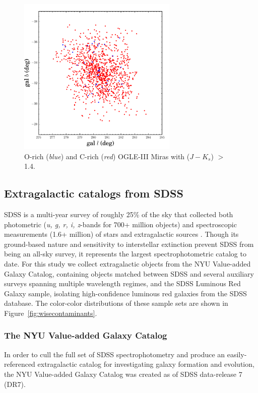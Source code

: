 \begin{figure}[h]
\includegraphics[width=3in]{figs/ogle_2mass_wise_miras.pdf}
\caption{O-rich (\emph{blue}) and C-rich (\emph{red}) OGLE-III Miras with ($J-K_s$) $>$ 1.4. \label{fig:oglegalplot}}
\end{figure}

\subsection{Extragalactic catalogs from SDSS}
SDSS is a multi-year survey of roughly 25\% of the sky that collected both photometric (\emph{u, g, r, i, z}-bands for 700+ million objects) and spectroscopic measurements (1.6+ million) of stars and extragalactic sources \citep{2000AJ....120.1579Y}. Though its ground-based nature and sensitivity to interstellar extinction prevent SDSS from being an all-sky survey, it represents the largest spectrophotometric catalog to date. For this study we collect extragalactic objects from the NYU Value-added Galaxy Catalog, containing objects matched between SDSS and several auxiliary surveys spanning multiple wavelength regimes, and the SDSS Luminous Red Galaxy sample, isolating high-confidence luminous red galaxies from the SDSS database. The color-color distributions of these sample sets are shown in Figure~\ref{fig:wisecontaminants}.

\subsubsection{The NYU Value-added Galaxy Catalog}
In order to cull the full set of SDSS spectrophotometry and produce an easily-referenced extragalactic catalog for investigating galaxy formation and evolution, the NYU Value-added Galaxy Catalog \citep[NYU-VAGC;][]{2005AJ....129.2562B} was created as of SDSS data-release 7 (DR7). 

